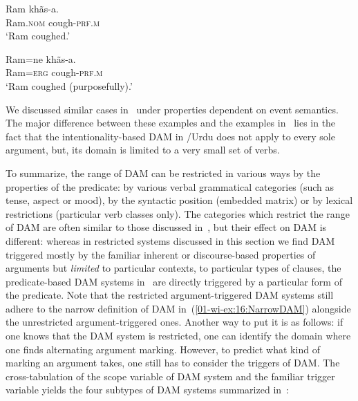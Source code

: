 \documentclass[output=paper]{LSP/langsci}
\begin{document}
\ea\label{01-wi-ex:24:Hindi-Urdu}
\begin{xlist}

\ex\label{01-wi-ex:24a:Hindi-Urdu}
	\gll Ram		khãs-a.\\
	Ram.\textsc{nom}	cough-\textsc{prf.m}\\
	\glt ‘Ram coughed.’

\ex\label{01-wi-ex:24b:Hindi-Urdu}
	\gll Ram=ne	khãs-a.\\
	Ram=\textsc{erg}	cough-\textsc{prf.m}\\
	\glt ‘Ram coughed (purposefully).’\\
\end{xlist}
\z

We discussed similar cases in~ under properties dependent on event semantics. 
The major difference between these examples and the examples in~ lies in the fact that the intentionality-based DAM in /Urdu does not apply to every sole argument, but, its domain is limited to a very small set of verbs.

To summarize, the range of DAM can be restricted in various ways by the properties of the predicate: by various verbal grammatical categories (such as tense, aspect or mood), by the syntactic position (\eg embedded \vs matrix) or by lexical restrictions (particular verb classes only). 
The categories which restrict the range of DAM are often similar to those discussed in~, but their effect on DAM is different: whereas in restricted systems discussed in this section we find DAM triggered mostly by the familiar inherent or discourse-based properties of arguments but \textit{limited} to particular contexts, \eg to particular types of clauses, the predicate-based DAM systems in~ are directly triggered by a particular form of the predicate.
Note that the restricted argument-triggered DAM systems still adhere to the narrow definition of DAM in~(\ref{01-wi-ex:16:NarrowDAM}) alongside the unrestricted argument-triggered ones. 
Another way to put it is as follows: if one knows that the DAM system is restricted, one can identify the domain where one finds alternating argument marking. 
However, to predict what kind of marking an argument takes, one still has to consider the triggers of DAM. 
The cross-tabulation of the scope variable of DAM system and the familiar trigger variable yields the four subtypes of DAM systems summarized in~:
\end{document}
